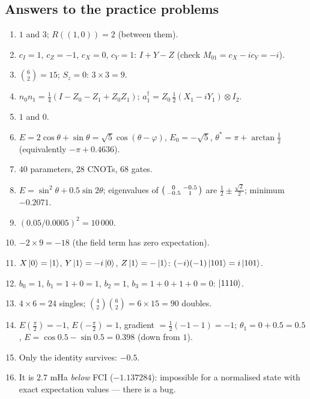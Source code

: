 \documentclass[11pt,a4paper,openany]{book}
\begin{document}
\newpage
\subsection*{Answers to the practice problems}
\begin{enumerate}[label=\textbf{P\arabic*.}, leftmargin=2.6em, itemsep=3pt]
\item $1$ and $3$; $R((1, 0)) = 2$ (between them).
\item $c_I = 1$, $c_Z = -1$, $c_X = 0$, $c_Y = 1$: $I + Y - Z$ (check $M_{01} = c_X - ic_Y = -i$).
\item $\binom62 = 15$; $S_z = 0$: $3\times3 = 9$.
\item $n_0n_1 = \frac14(I - Z_0 - Z_1 + Z_0Z_1)$; $a_1^\dagger = Z_0\,\frac12(X_1 - iY_1)\otimes I_2$.
\item $1$ and $0$.
\item $E = 2\cos\theta + \sin\theta = \sqrt5\cos(\theta - \varphi)$, $E_0 = -\sqrt5$, $\theta^* = \pi + \arctan\frac12$ (equivalently $-\pi + 0.4636$).
\item $40$ parameters, $28$ CNOTs, $68$ gates.
\item $E = \sin^2\theta + 0.5\sin2\theta$; eigenvalues of $\begin{psmallmatrix}0&-0.5\\-0.5&1\end{psmallmatrix}$ are $\frac12 \pm \frac{\sqrt2}{2}$; minimum $-0.2071$.
\item $(0.05/0.0005)^2 = 10\,000$.
\item $-2\times9 = -18$ (the field term has zero expectation).
\item $X\ket0 = \ket1$, $Y\ket1 = -i\ket0$, $Z\ket1 = -\ket1$: $(-i)(-1)\ket{101} = i\ket{101}$.
\item $b_0 = 1$, $b_1 = 1 + 0 = 1$, $b_2 = 1$, $b_3 = 1 + 0 + 1 + 0 = 0$: $\ket{1110}$.
\item $4\times6 = 24$ singles; $\binom42\binom62 = 6\times15 = 90$ doubles.
\item $E(\frac\pi2) = -1$, $E(-\frac\pi2) = 1$, gradient $= \frac12(-1 - 1) = -1$; $\theta_1 = 0 + 0.5 = 0.5$, $E = \cos0.5 - \sin0.5 = 0.398$ (down from $1$).
\item Only the identity survives: $-0.5$.
\item It is $2.7$ mHa \emph{below} FCI ($-1.137284$): impossible for a normalised state with exact expectation values --- there is a bug.
\end{enumerate}
\end{document}
